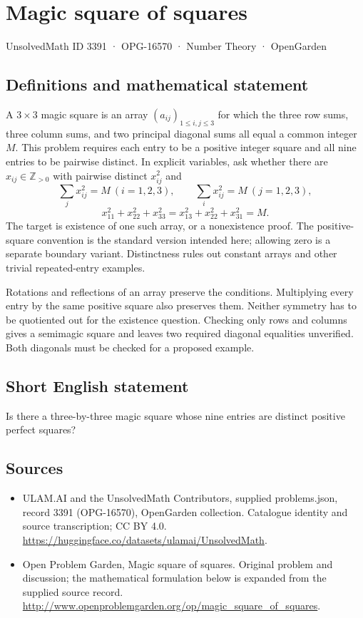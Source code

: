 \documentclass[11pt,a4paper]{article}
\begin{document}
\section*{Magic square of squares}\label{3391}
{\small UnsolvedMath ID 3391 · OPG-16570 · Number Theory · OpenGarden}
\subsection{Definitions and mathematical statement}
A $3\times3$ magic square is an array $(a_{ij})_{1\le i,j\le3}$
for which the three row sums, three column sums, and two principal
diagonal sums all equal a common integer $M$. This problem requires
each entry to be a positive integer square and all nine entries to
be pairwise distinct. In explicit variables, ask whether there are
$x_{ij}\in\mathbb Z_{>0}$ with pairwise distinct $x_{ij}^2$ and
\[
 \sum_jx_{ij}^2=M\ (i=1,2,3),\qquad
 \sum_ix_{ij}^2=M\ (j=1,2,3),
\]
\[
 x_{11}^2+x_{22}^2+x_{33}^2
       =x_{13}^2+x_{22}^2+x_{31}^2=M.
\]
The target is existence of one such array, or a nonexistence proof.
The positive-square convention is the standard version intended
here; allowing zero is a separate boundary variant. Distinctness
rules out constant arrays and other trivial repeated-entry examples.

Rotations and reflections of an array preserve the conditions.
Multiplying every entry by the same positive square also preserves
them. Neither symmetry has to be quotiented out for the existence
question. Checking only rows and columns gives a semimagic square
and leaves two required diagonal equalities unverified. Both
diagonals must be checked for a proposed example.
\subsection{Short English statement}
Is there a three-by-three magic square whose nine entries are distinct positive perfect squares?
\subsection{Sources}
\begin{itemize}
\item[S1] ULAM.AI and the UnsolvedMath Contributors, supplied problems.json, record 3391 (OPG-16570), OpenGarden collection. Catalogue identity and source transcription; CC BY 4.0.
\url{https://huggingface.co/datasets/ulamai/UnsolvedMath}.
\item[S2] Open Problem Garden, Magic square of squares. Original problem and discussion; the mathematical formulation below is expanded from the supplied source record.
\url{http://www.openproblemgarden.org/op/magic_square_of_squares}.
\end{itemize}
\end{document}

